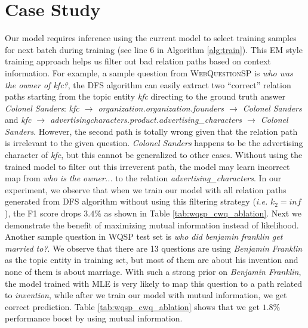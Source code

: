 \section{Case Study}


Our model requires inference using the current model to select training samples for next batch during training (see line 6 in Algorithm \ref{alg:train}). This EM style training approach helps us filter out bad relation paths based on context information. For example, a sample question from \textsc{WebQuestionSP} is \textit{who was the owner of kfc?}, the DFS algorithm can easily extract two ``correct'' relation paths starting from the topic entity \textit{kfc} directing to the ground truth answer \textit{Colonel Sanders}: \textit{kfc $\rightarrow$ organization.organization.founders $\rightarrow$ Colonel Sanders} and \textit{kfc $\rightarrow$ advertisingcharacters.product.advertising\_characters $\rightarrow$ Colonel Sanders}. However, the second path is totally wrong given that the relation path is irrelevant to the given question. \textit{Colonel Sanders} happens to be the advertising character of \textit{kfc}, but this cannot be generalized to other cases. Without using the trained model to filter out this irreverent path, the model may learn incorrect map from \textit{who is the owner...} to the relation \textit{advertising\_characters}. In our experiment, we observe that when we train our model with all relation paths generated from DFS algorithm without using this filtering strategy (\emph{i.e.} $k_2=inf$), the F1 score drops $3.4\%$ as shown in Table \ref{tab:wqsp_cwq_ablation}. Next we demonstrate the benefit of maximizing mutual information instead of likelihood. Another sample question in WQSP test set is \textit{who did benjamin franklin get married to?}. We observe that there are 13 questions are using \textit{Benjamin Franklin} as the topic entity in training set, but most of them are about his invention and none of them is about marriage. With such a strong prior on \textit{Benjamin Franklin}, the model trained with MLE is very likely to map this question to a path related to \textit{invention}, while after we train our model with mutual information, we get correct prediction. Table \ref{tab:wqsp_cwq_ablation} shows that we get $1.8\%$ performance boost by using mutual information.




